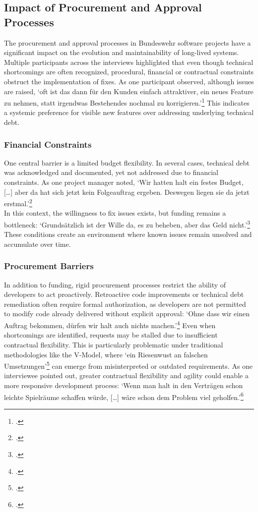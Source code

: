 \subsection{Impact of Procurement and Approval Processes}
The procurement and approval processes in Bundeswehr software projects have a significant impact on the evolution and maintainability of long-lived systems. Multiple participants across the interviews highlighted that even though technical shortcomings are often recognized, 
procedural, financial or contractual constraints obstruct the implementation of fixes. As one participant observed, although issues are raised, `oft ist das dann für den Kunden einfach attraktiver, ein neues Feature zu nehmen, statt irgendwas Bestehendes nochmal zu korrigieren.'\footcite{interview3}
This indicates a systemic preference for visible new features over addressing underlying technical debt.

\subsubsection{Financial Constraints}
One central barrier is a limited budget flexibility. In several cases, technical debt was acknowledged and documented, yet not addressed due to financial constraints. As one project manager noted, `Wir hatten halt ein festes Budget, [\ldots] aber da hat sich jetzt kein Folgeauftrag ergeben. Deswegen liegen sie da jetzt erstmal.'\footcite{interview1}\\
In this context, the willingness to fix issues exists, but funding remains a bottleneck: `Grundsätzlich ist der Wille da, es zu beheben, aber das Geld nicht.'\footcite{interview3} These conditions create an environment where known issues remain unsolved and accumulate over time.

\subsubsection{Procurement Barriers}
In addition to funding, rigid procurement processes restrict the ability of developers to act proactively. Retroactive code improvements or technical debt remediation often require formal authorization, as developers are not permitted to modify code already delivered without explicit approval:
`Ohne dass wir einen Auftrag bekommen, dürfen wir halt auch nichts machen.'\footcite{interview3} Even when shortcomings are identified, requests may be stalled due to insufficient contractual flexibility. This is particularly problematic under traditional methodologies like the V-Model, where
`ein Riesenwust an falschen Umsetzungen'\footcite{interview3} can emerge from misinterpreted or outdated requirements. As one interviewee pointed out, greater contractual flexibility and agility could enable a more responsive development process:
`Wenn man halt in den Verträgen schon leichte Spielräume schaffen würde, [\ldots] wäre schon dem Problem viel geholfen.'\footcite{interview3}\\

